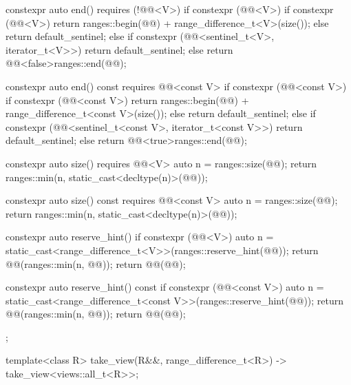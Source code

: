 \begin{codeblock}
{{    constexpr auto end() requires (!@@<V>) {
      if constexpr (@@<V>) {
        if constexpr (@@<V>)
          return ranges::begin(@@) + range_difference_t<V>(size());
        else
          return default_sentinel;
      } else if constexpr (@@<sentinel_t<V>, iterator_t<V>>) {
        return default_sentinel;
      } else {
        return @@<false>{ranges::end(@@)};
      }
    }

    constexpr auto end() const requires @@<const V> {
      if constexpr (@@<const V>) {
        if constexpr (@@<const V>)
          return ranges::begin(@@) + range_difference_t<const V>(size());
        else
          return default_sentinel;
      } else if constexpr (@@<sentinel_t<const V>, iterator_t<const V>>) {
        return default_sentinel;
      } else {
        return @@<true>{ranges::end(@@)};
      }
    }

    constexpr auto size() requires @@<V> {
      auto n = ranges::size(@@);
      return ranges::min(n, static_cast<decltype(n)>(@@));
    }

    constexpr auto size() const requires @@<const V> {
      auto n = ranges::size(@@);
      return ranges::min(n, static_cast<decltype(n)>(@@));
    }

    constexpr auto reserve_hint() {
      if constexpr (@@<V>) {
        auto n = static_cast<range_difference_t<V>>(ranges::reserve_hint(@@));
        return @@(ranges::min(n, @@));
      }
      return @@(@@);
    }

    constexpr auto reserve_hint() const {
      if constexpr (@@<const V>) {
        auto n = static_cast<range_difference_t<const V>>(ranges::reserve_hint(@@));
        return @@(ranges::min(n, @@));
      }
      return @@(@@);
    }
  };

  template<class R>
    take_view(R&&, range_difference_t<R>)
      -> take_view<views::all_t<R>>;
}
\end{codeblock}

